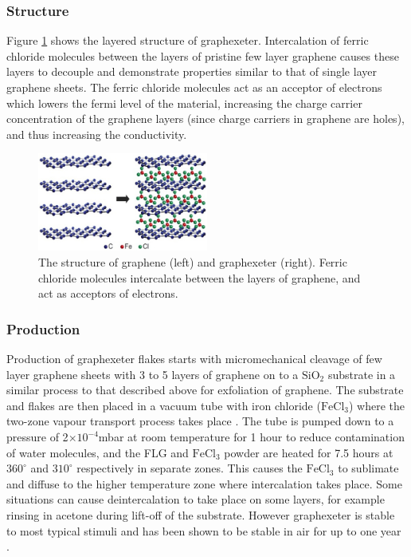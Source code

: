 \documentclass[12pt,titlepage]{article}
\providecommand{\e}[1]{\ensuremath{\times10^{#1}}}
\begin{document}
	\subsubsection{Structure}
	Figure \ref{fig:graphexeter} shows the layered structure of graphexeter. Intercalation of ferric chloride molecules between the layers of pristine few layer graphene causes these layers to decouple and demonstrate properties similar to that of single layer graphene sheets. The ferric chloride molecules act as an acceptor of electrons which lowers the fermi level of the material, increasing the charge carrier concentration of the graphene layers (since charge carriers in graphene are holes), and thus increasing the conductivity.
	
	\begin{figure}
		\centering
		\includegraphics[width=0.5\textwidth]{figures/graphexeter.jpg}
		\caption[The structure of graphene and graphexeter.]{The structure of graphene (left) and graphexeter (right). Ferric chloride molecules intercalate between the layers of graphene, and act as acceptors of electrons.}
		\label{fig:graphexeter}
	\end{figure}
	
	\subsubsection{Production}
	Production of graphexeter flakes starts with micromechanical cleavage of few layer graphene sheets with 3 to 5 layers of graphene on to a $\text{SiO}_2$ substrate in a similar process to that described above for exfoliation of graphene. The substrate and flakes are then placed in a vacuum tube with iron chloride ($\text{FeCl}_3$) where the two-zone vapour transport process takes place \cite{Khrapach2012a,Zhan2004}. The tube is pumped down to a pressure of 2\e{-4}mbar at room temperature for 1 hour to reduce contamination of water molecules, and the FLG and $\text{FeCl}_3$ powder are heated for 7.5 hours at $360^{\circ}$ and $310^{\circ}$ respectively in separate zones. This causes the $\text{FeCl}_3$ to sublimate and diffuse to the higher temperature zone where intercalation takes place. Some situations can cause deintercalation to take place on some layers, for example rinsing in acetone during lift-off of the substrate. However graphexeter is stable to most typical stimuli and has been shown to be stable in air for up to one year \cite{Khrapach2012a}.
	
\end{document}
